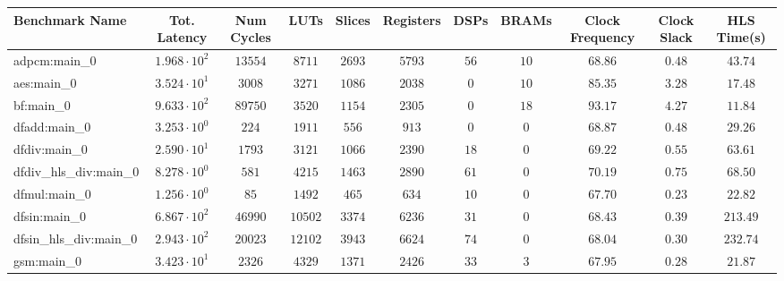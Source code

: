 \begin{tabular}{|l|c|c|c|c|c|c|c|c|c|c|}
\hline
Benchmark Name          & Tot. Latency           & Num Cycles & LUTs      & Slices    & Registers & DSPs    & BRAMs   & Clock Frequency & Clock Slack & HLS Time(s) \\
\hline
adpcm:main\_0           & $ 1.968 \cdot 10^{2} $ & $ 13554  $ & $ 8711  $ & $ 2693  $ & $ 5793  $ & $ 56  $ & $ 10  $ & $ 68.86       $ & $ 0.48    $ & $ 43.74   $ \\
aes:main\_0             & $ 3.524 \cdot 10^{1} $ & $ 3008   $ & $ 3271  $ & $ 1086  $ & $ 2038  $ & $ 0   $ & $ 10  $ & $ 85.35       $ & $ 3.28    $ & $ 17.48   $ \\
bf:main\_0              & $ 9.633 \cdot 10^{2} $ & $ 89750  $ & $ 3520  $ & $ 1154  $ & $ 2305  $ & $ 0   $ & $ 18  $ & $ 93.17       $ & $ 4.27    $ & $ 11.84   $ \\
dfadd:main\_0           & $ 3.253 \cdot 10^{0} $ & $ 224    $ & $ 1911  $ & $ 556   $ & $ 913   $ & $ 0   $ & $ 0   $ & $ 68.87       $ & $ 0.48    $ & $ 29.26   $ \\
dfdiv:main\_0           & $ 2.590 \cdot 10^{1} $ & $ 1793   $ & $ 3121  $ & $ 1066  $ & $ 2390  $ & $ 18  $ & $ 0   $ & $ 69.22       $ & $ 0.55    $ & $ 63.61   $ \\
dfdiv\_hls\_div:main\_0 & $ 8.278 \cdot 10^{0} $ & $ 581    $ & $ 4215  $ & $ 1463  $ & $ 2890  $ & $ 61  $ & $ 0   $ & $ 70.19       $ & $ 0.75    $ & $ 68.50   $ \\
dfmul:main\_0           & $ 1.256 \cdot 10^{0} $ & $ 85     $ & $ 1492  $ & $ 465   $ & $ 634   $ & $ 10  $ & $ 0   $ & $ 67.70       $ & $ 0.23    $ & $ 22.82   $ \\
dfsin:main\_0           & $ 6.867 \cdot 10^{2} $ & $ 46990  $ & $ 10502 $ & $ 3374  $ & $ 6236  $ & $ 31  $ & $ 0   $ & $ 68.43       $ & $ 0.39    $ & $ 213.49  $ \\
dfsin\_hls\_div:main\_0 & $ 2.943 \cdot 10^{2} $ & $ 20023  $ & $ 12102 $ & $ 3943  $ & $ 6624  $ & $ 74  $ & $ 0   $ & $ 68.04       $ & $ 0.30    $ & $ 232.74  $ \\
gsm:main\_0             & $ 3.423 \cdot 10^{1} $ & $ 2326   $ & $ 4329  $ & $ 1371  $ & $ 2426  $ & $ 33  $ & $ 3   $ & $ 67.95       $ & $ 0.28    $ & $ 21.87   $ \\

\end{tabular}
